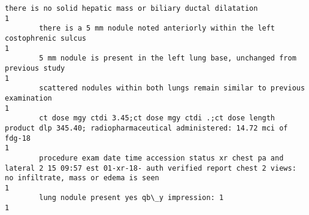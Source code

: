 \documentclass[11pt]{article}
\begin{document}
\begin{Verbatim}[commandchars=\\\{\}]
        there is no solid hepatic mass or biliary ductal dilatation                                                                                                                                                                                                                                                                                                                                                                     1
        there is a 5 mm nodule noted anteriorly within the left costophrenic sulcus                                                                                                                                                                                                                                                                                                                                                     1
        5 mm nodule is present in the left lung base, unchanged from previous study                                                                                                                                                                                                                                                                                                                                                     1
        scattered nodules within both lungs remain similar to previous examination                                                                                                                                                                                                                                                                                                                                                      1
        ct dose mgy ctdi 3.45;ct dose mgy ctdi .;ct dose length product dlp 345.40; radiopharmaceutical administered: 14.72 mci of fdg-18                                                                                                                                                                                                                                                                                               1
        procedure exam date time accession status xr chest pa and lateral 2 15 09:57 est 01-xr-18- auth verified report chest 2 views: no infiltrate, mass or edema is seen                                                                                                                                                                                                                                                             1
        lung nodule present yes qb\_y impression: 1                                                                                                                                                                                                                                                                                                                                                                                      1

\end{Verbatim}
\end{document}
